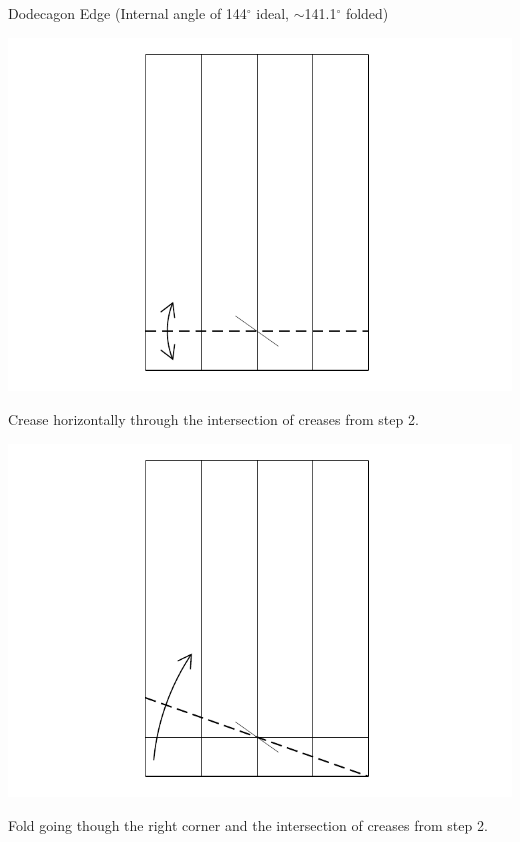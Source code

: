 \documentclass[11pt]{article}
\begin{document}
\newpage
{\Large Dodecagon Edge} (Internal angle of 144$^\circ$ ideal, $\sim$141.1$^\circ$ folded)
\vspace*{0.25in}

\begin{minipage}[t]{0.3\textwidth}
  \includegraphics[width=\textwidth]{../figs/fig10-04}
  \begin{itemize}{\item[4.] Crease horizontally through the intersection of creases from step 2.}\end{itemize}
\end{minipage}
\begin{minipage}[t]{0.3\textwidth}
  \includegraphics[width=\textwidth]{../figs/fig10-05}
  \begin{itemize}{\item[5.] Fold going though the right corner and the intersection of creases from step 2.}\end{itemize}
\end{minipage}
\end{document}
